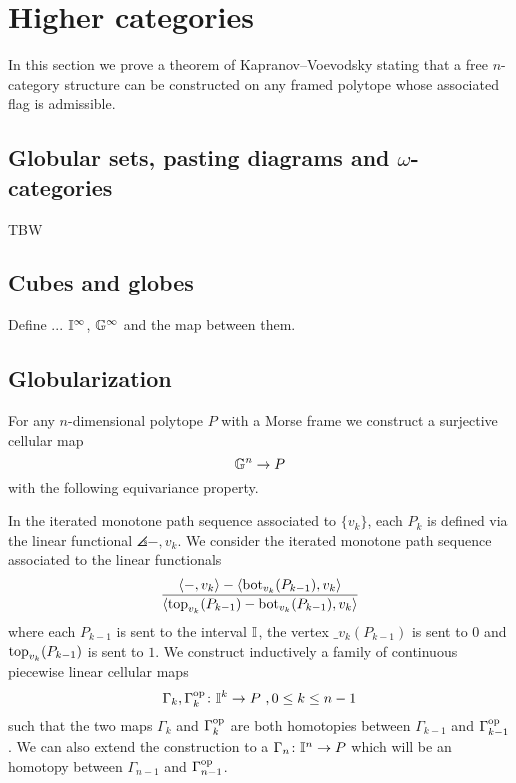 
\section{Higher categories}

In this section we prove a theorem of Kapranov--Voevodsky \cite{kapranov1991polycategory} stating that a free $n$-category structure can be constructed on any framed polytope whose associated flag is admissible.

\subsection{Globular sets, pasting diagrams and $\omega$-categories}

TBW

\subsection{Cubes and globes}

Define ... $\mathbb{I}^\infty$, $\mathbb{G}^\infty$ and the map between them.

\subsection{Globularization} \label{ss:globularization}

For any $n$-dimensional polytope $P$ with a Morse frame we construct a surjective cellular map
\[
\mathbb{G}^n \to P
\]
with the following equivariance property.


In the iterated monotone path sequence associated to $\{v_k\}$, each $P_k$ is defined via the linear functional $\angles{-,v_k}$.
We consider the iterated monotone path sequence associated to the linear functionals
\begin{equation} \label{eq:new-projection}
	\frac{\langle-,v_k\rangle-\langle\operatorname{bot}_{v_k}(P_{k-1}),v_k\rangle}{\langle\operatorname{top}_{v_k}(P_{k-1})-\operatorname{bot}_{v_k}(P_{k-1}),v_k\rangle}
\end{equation}
where each $P_{k-1}$ is sent to the interval $\mathbb{I}$, the vertex $\bm_{v_k}(P_{k-1})$ is sent to $0$ and $\operatorname{top}_{v_k}(P_{k-1})$ is sent to $1$.
We construct inductively a family of continuous piecewise linear cellular maps
\[
\Gamma_k, \Gamma_k^{\mathrm{op}} \colon \mathbb{I}^k \to P \ , 0 \leq k \leq n-1
\]
such that the two maps $\Gamma_k$ and $\Gamma_k^{\mathrm{op}}$ are both homotopies between $\Gamma_{k-1}$ and $\Gamma_{k-1}^{\mathrm{op}}$.
We can also extend the construction to a $\Gamma_n \colon \mathbb{I}^n \to P$ which will be an homotopy between $\Gamma_{n-1}$ and $\Gamma_{n-1}^{\mathrm{op}}$.

